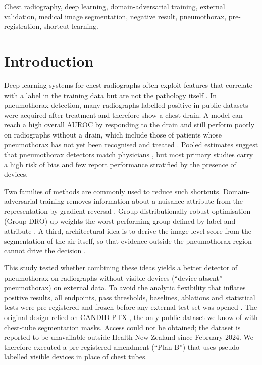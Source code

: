 \documentclass{ieeeaccess}
\begin{document}
\begin{keywords}
Chest radiography, deep learning, domain-adversarial training, external validation, medical image segmentation, negative result, pneumothorax, pre-registration, shortcut learning.
\end{keywords}

\titlepgskip=-21pt

\maketitle

\section{Introduction}
\label{sec:intro}

Deep learning systems for chest radiographs often exploit features that correlate with a label in the training data but are not the pathology itself \cite{geirhos2020shortcut,zech2018variable,degrave2021covid,badgeley2019hip,banerjee2023shortcuts}. In pneumothorax detection, many radiographs labelled positive in public datasets were acquired after treatment and therefore show a chest drain. A model can reach a high overall AUROC by responding to the drain and still perform poorly on radiographs without a drain, which include those of patients whose pneumothorax has not yet been recognised and treated \cite{oakdenrayner2020hidden,taylor2018pneumothorax,rueckel2020tubes}. Pooled estimates suggest that pneumothorax detectors match physicians \cite{sugibayashi2023meta,katzman2024meta}, but most primary studies carry a high risk of bias and few report performance stratified by the presence of devices.

Two families of methods are commonly used to reduce such shortcuts. Domain-adversarial training removes information about a nuisance attribute from the representation by gradient reversal \cite{ganin2015dann,kim2019learning,zhao2020confounder}. Group distributionally robust optimisation (Group DRO) up-weights the worst-performing group defined by label and attribute \cite{sagawa2020groupdro}. A third, architectural idea is to derive the image-level score from the segmentation of the air itself, so that evidence outside the pneumothorax region cannot drive the decision \cite{rueckel2021annotations}.

This study tested whether combining these ideas yields a better detector of pneumothorax on radiographs without visible devices (``device-absent'' pneumothorax) on external data. To avoid the analytic flexibility that inflates positive results, all endpoints, pass thresholds, baselines, ablations and statistical tests were pre-registered and frozen before any external test set was opened \cite{nosek2018prereg}. The original design relied on CANDID-PTX \cite{feng2021candid}, the only public dataset we know of with chest-tube segmentation masks. Access could not be obtained; the dataset is reported to be unavailable outside Health New Zealand since February 2024. We therefore executed a pre-registered amendment (``Plan B'') that uses pseudo-labelled visible devices in place of chest tubes.
\end{document}
